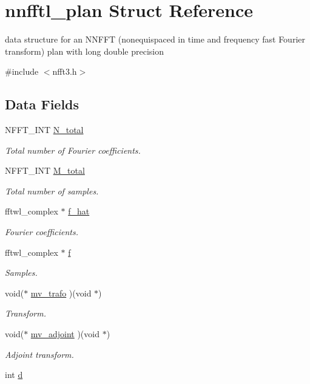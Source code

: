 \hypertarget{structnnfftl__plan}{\section{nnfftl\-\_\-plan Struct Reference}
\label{structnnfftl__plan}
}


data structure for an N\-N\-F\-F\-T (nonequispaced in time and frequency fast Fourier transform) plan with long double precision  




{\ttfamily \#include $<$nfft3.\-h$>$}

\subsection*{Data Fields}
\begin{DoxyCompactItemize}
\item 
N\-F\-F\-T\-\_\-\-I\-N\-T \hyperlink{structnnfftl__plan_af772842479519af7bfb47dcfd28ae6ff}{N\-\_\-total}
\begin{DoxyCompactList}\small\item\em Total number of Fourier coefficients. \end{DoxyCompactList}\item 
N\-F\-F\-T\-\_\-\-I\-N\-T \hyperlink{structnnfftl__plan_a2ad9f2c611d3f7caa3bdb91f7de24964}{M\-\_\-total}
\begin{DoxyCompactList}\small\item\em Total number of samples. \end{DoxyCompactList}\item 
fftwl\-\_\-complex $\ast$ \hyperlink{structnnfftl__plan_a97bc689ffe1f4c8eb99ee43cf408c662}{f\-\_\-hat}
\begin{DoxyCompactList}\small\item\em Fourier coefficients. \end{DoxyCompactList}\item 
fftwl\-\_\-complex $\ast$ \hyperlink{structnnfftl__plan_a6aaa7904dbee73679d86060f1842a04e}{f}
\begin{DoxyCompactList}\small\item\em Samples. \end{DoxyCompactList}\item 
void($\ast$ \hyperlink{structnnfftl__plan_a39b1bdd9a3eacd4ff3b809eeef01f364}{mv\-\_\-trafo} )(void $\ast$)
\begin{DoxyCompactList}\small\item\em Transform. \end{DoxyCompactList}\item 
void($\ast$ \hyperlink{structnnfftl__plan_aa6098f51f9c69196ca782a1b0f8feeba}{mv\-\_\-adjoint} )(void $\ast$)
\begin{DoxyCompactList}\small\item\em Adjoint transform. \end{DoxyCompactList}\item 
\hypertarget{structnnfftl__plan_a14dac9d67ed25ff370516f66668a8ec6}{int \hyperlink{structnnfftl__plan_a14dac9d67ed25ff370516f66668a8ec6}{d}}\label{structnnfftl__plan_a14dac9d67ed25ff370516f66668a8ec6}


\end{DoxyCompactItemize}
